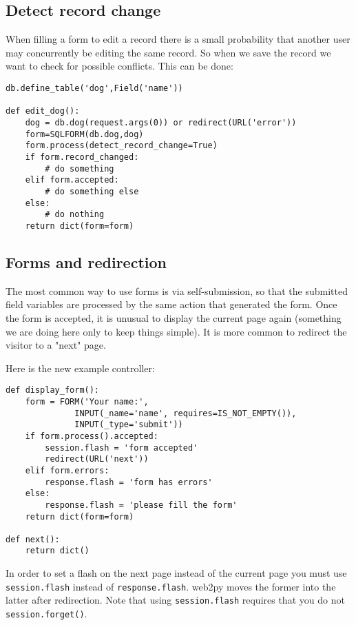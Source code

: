 \documentclass[justified,sixbynine,notoc]{tufte-book}
\def\ft{\small\tt}
\begin{document}
\begin{fullwidth}
\goodbreak\subsection{Detect record change}

When filling a form to edit a record there is a small probability that another user may concurrently be editing the same record. So when we save the record we want to check for possible conflicts. This can be done:

\begin{lstlisting}
db.define_table('dog',Field('name'))

def edit_dog():
    dog = db.dog(request.args(0)) or redirect(URL('error'))
    form=SQLFORM(db.dog,dog)
    form.process(detect_record_change=True)
    if form.record_changed:
        # do something
    elif form.accepted:
        # do something else
    else:
        # do nothing
    return dict(form=form)
\end{lstlisting}

\goodbreak\subsection{Forms and redirection}

The most common way to use forms is via self-submission, so that the submitted field variables are processed by the same action that generated the form. Once the form is accepted, it is unusual to display the current page again (something we are doing here only to keep things simple). It is more common to redirect the visitor to a "next" page.

Here is the new example controller:
\begin{lstlisting}
def display_form():
    form = FORM('Your name:',
              INPUT(_name='name', requires=IS_NOT_EMPTY()),
              INPUT(_type='submit'))
    if form.process().accepted:
        session.flash = 'form accepted'
        redirect(URL('next'))
    elif form.errors:
        response.flash = 'form has errors'
    else:
        response.flash = 'please fill the form'
    return dict(form=form)

def next():
    return dict()
\end{lstlisting}

In order to set a flash on the next page instead of the current page you must use {\ft session.flash} instead of {\ft response.flash}. web2py moves the former into the latter after redirection. Note that using {\ft session.flash} requires that you do not {\ft session.forget()}.


\end{fullwidth}
\end{document}
